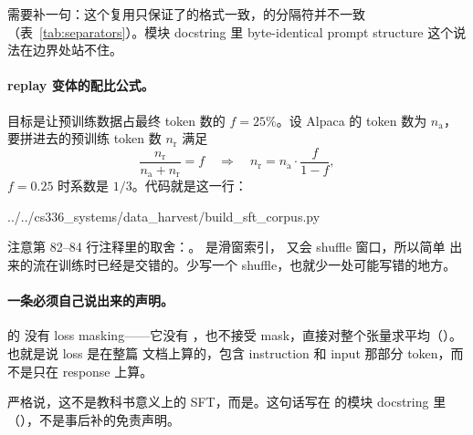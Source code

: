 需要补一句：这个复用只保证了的格式一致，的分隔符并不一致（表~\ref{tab:separators}）。模块 docstring 里 byte-identical prompt structure 这个说法在边界处站不住。

\paragraph{replay 变体的配比公式。}目标是让预训练数据占最终 token 数的 $f=25\%$。设 Alpaca 的 token 数为 $n_{\mathrm{a}}$，要拼进去的预训练 token 数 $n_{\mathrm{r}}$ 满足
\[
\frac{n_{\mathrm{r}}}{n_{\mathrm{a}} + n_{\mathrm{r}}} = f
\quad\Longrightarrow\quad
n_{\mathrm{r}} = n_{\mathrm{a}}\cdot\frac{f}{1-f} ,
\]
$f=0.25$ 时系数是 $1/3$。代码就是这一行：

%
  {../../cs336_systems/data_harvest/build_sft_corpus.py}

注意第 82--84 行注释里的取舍：。 是滑窗索引， 又会 shuffle 窗口，所以简单  出来的流在训练时已经是交错的。少写一个 shuffle，也就少一处可能写错的地方。

\paragraph{一条必须自己说出来的声明。} 的  没有 loss masking——它没有 ，也不接受 mask，直接对整个张量求平均（）。也就是说 loss 是在整篇  文档上算的，包含 instruction 和 input 那部分 token，而不是只在 response 上算。

严格说，这不是教科书意义上的 SFT，而是。这句话写在  的模块 docstring 里（），不是事后补的免责声明。

